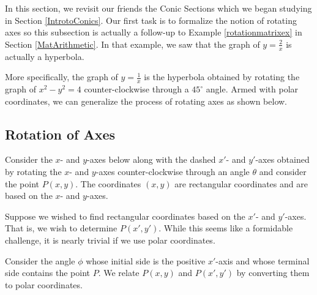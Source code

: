 \documentclass{ximera}
\begin{document}
	\author{Stitz-Zeager}




\setcounter{footnote}{0}

\label{PolarConics}

In this section, we revisit our friends the Conic Sections which we began studying in Section \ref{IntrotoConics}.  Our first task is to formalize the notion of rotating axes so this subsection is actually a follow-up to Example  \ref{rotationmatrixex} in Section \ref{MatArithmetic}. In that example, we saw that the graph of $y = \frac{2}{x}$ is actually a hyperbola.  

 

More specifically, the graph of $y = \frac{1}{x}$ is the hyperbola  obtained by rotating the graph of $x^2-y^2=4$ counter-clockwise through a $45^{\circ}$ angle.  Armed with polar coordinates, we can generalize the process of rotating axes as shown below.


\subsection{Rotation of Axes}
\label{rotationaxes}

Consider the $x$- and $y$-axes below along with the dashed $x'$- and $y'$-axes obtained by rotating the $x$- and $y$-axes counter-clockwise through an angle $\theta$ and consider the point $P(x,y)$.  The coordinates $(x,y)$ are rectangular coordinates and are based on the $x$- and $y$-axes.  

 

Suppose we wished to find rectangular coordinates based on the $x'$- and $y'$-axes.  That is, we wish to determine $P(x',y')$.  While this seems like a formidable challenge, it is nearly trivial if we use polar coordinates.  

 

Consider the angle $\phi$ whose initial side is the positive $x'$-axis and whose terminal side contains the point $P$.   We relate $P(x,y)$ and $P(x',y')$ by converting them to polar coordinates. 
\end{document}
